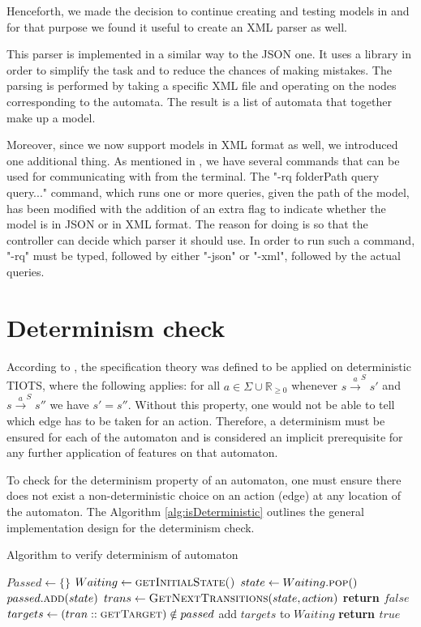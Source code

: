 Henceforth, we made the decision to continue creating and testing models in  and for that purpose we found it useful to create an XML parser as well. 

This parser is implemented in a similar way to the JSON one. It uses a library in order to simplify the task and to reduce the chances of making mistakes. The parsing is performed by taking a specific XML file and operating on the nodes corresponding to the automata. The result is a list of automata that together make up a model.

Moreover, since we now support models in XML format as well, we introduced one additional thing. As mentioned in \textcite{Jecdar:2019}, we have several commands that can be used for communicating with \jecdar from the terminal. The "-rq folderPath query query..." command, which runs one or more queries, given the path of the model, has been modified with the addition of an extra flag to indicate whether the model is in JSON or in XML format. The reason for doing is so that the controller can decide which parser it should use. In order to run such a command, "-rq" must be typed, followed by either "-json" or "-xml", followed by the actual queries.

\section{Determinism check} \label{sec:implDeterm}
According to \textcite{David:2010}, the specification theory was defined to be applied on deterministic TIOTS, where the following applies: for all $a \in \Sigma \cup \mathbb{R}_{\geq 0}$ whenever $s\xrightarrow{a}^S s'$ and $s\xrightarrow{a}^S s''$ we have $s' = s''$. Without this property, one would not be able to tell which edge has to be taken for an action. Therefore, a determinism must be ensured for each of the automaton and is considered an implicit prerequisite for any further application of features on that automaton.

To check for the determinism property of an automaton, one must ensure there does not exist a non-deterministic choice on an action (edge) at any location of the automaton. The Algorithm \ref{alg:isDeterministic} outlines the general implementation design for the determinism check.

\begin{algorithm}
\caption{Algorithm to verify determinism of automaton}
\label{alg:isDeterministic}
\begin{algorithmic}[1]
\State $Passed \gets \{\}$ 
\State $Waiting \gets \textsc{getInitialState()}$
    \State $state \gets Waiting.\textsc{pop}()$
    \State $passed.\textsc{add}(state)$
        \State $trans \gets \textsc{GetNextTransitions}(state, action)$
            \State \textbf{return $false$}
        \Else
        \State $targets \gets (tran::\textsc{getTarget}) \notin passed $
        \State add $targets$ to $Waiting$
        \EndIf
    \EndFor
\EndWhile
\State
\State \textbf{return $true$} 
\EndFunction
\end{algorithmic}
\end{algorithm}

